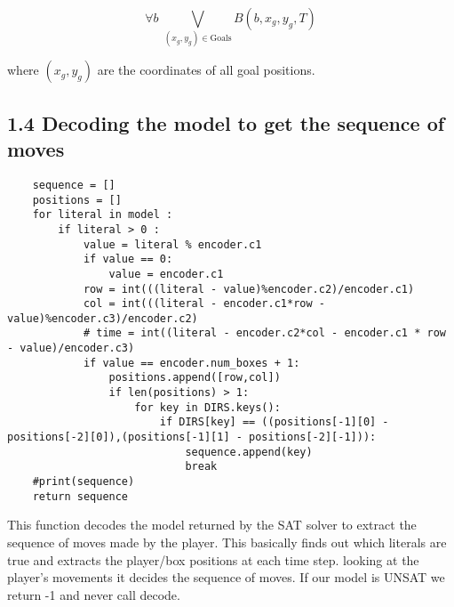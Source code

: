 \documentclass[12pt,a4paper]{article}
\begin{document}
\[
\forall b \; \bigvee_{(x_g, y_g) \in \text{Goals}} B(b, x_g, y_g, T)
\]

where \((x_g, y_g)\) are the coordinates of all goal positions.
\newpage
\subsection*{1.4 Decoding the model to get the sequence of moves}
\begin{lstlisting}
    sequence = []
    positions = []
    for literal in model :
        if literal > 0 : 
            value = literal % encoder.c1
            if value == 0:
                value = encoder.c1
            row = int(((literal - value)%encoder.c2)/encoder.c1)
            col = int(((literal - encoder.c1*row - value)%encoder.c3)/encoder.c2)
            # time = int((literal - encoder.c2*col - encoder.c1 * row - value)/encoder.c3)
            if value == encoder.num_boxes + 1:
                positions.append([row,col])
                if len(positions) > 1:
                    for key in DIRS.keys():
                        if DIRS[key] == ((positions[-1][0] - positions[-2][0]),(positions[-1][1] - positions[-2][-1])):
                            sequence.append(key)
                            break
    #print(sequence)
    return sequence
\end{lstlisting}
This function decodes the model returned by the SAT solver to extract the sequence of moves made by the player.
This basically finds out which literals are true and extracts the player/box positions at each time step. looking at the player's movements it decides the sequence of moves. If our model is UNSAT we return -1 and never call decode.
\end{document}
